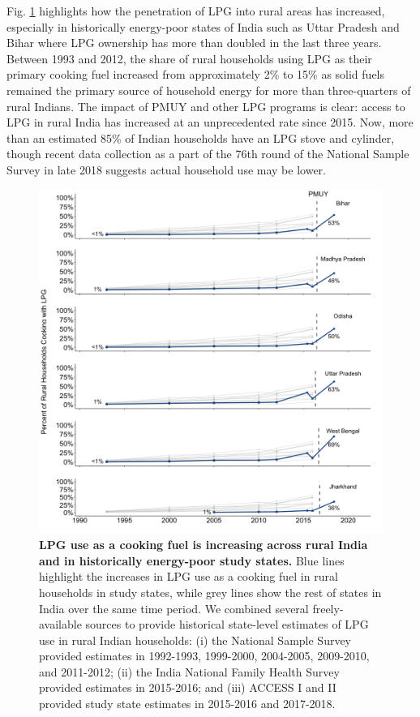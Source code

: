 \documentclass[11pt,english]{article}
\theoremstyle{plain} \newtheorem{claim}{Claim}
\theoremstyle{plain} \newtheorem{prop}{Proposition}
\theoremstyle{plain} \newtheorem{hypo}{Hypothesis}
\begin{document}
Fig. \ref{lpgtransition} highlights how the penetration of LPG into rural areas has increased, especially in historically energy-poor states of India such as Uttar Pradesh and Bihar where LPG ownership has more than doubled in the last three years. Between 1993 and 2012, the share of rural households using LPG as their primary cooking fuel increased from approximately 2\% to 15\% as solid fuels remained the primary source of household energy for more than three-quarters of rural Indians\citep{NationalSampleSurvey2015}. The impact of PMUY and other LPG programs is clear: access to LPG in rural India has increased at an unprecedented rate since 2015. Now, more than an estimated 85\% of Indian households have an LPG stove and cylinder\citep{MOPNG2019}, though recent data collection as a part of the 76th round of the National Sample Survey in late 2018 suggests actual household use may be lower\citep{MOSPI2019}.

 
\begin{figure}[h!]
\centering
\includegraphics[scale=0.46]{Figures/StateLPGTransition_Facet_Rural.png}
\caption{\textbf{LPG use as a cooking fuel is increasing across rural India and in historically energy-poor study states.} Blue lines highlight the increases in LPG use as a cooking fuel in rural households in study states, while grey lines show the rest of states in India over the same time period. We combined several freely-available sources to provide historical state-level estimates of LPG use in rural Indian households: (i) the National Sample Survey provided estimates in 1992-1993, 1999-2000, 2004-2005, 2009-2010, and 2011-2012; (ii) the India National Family Health Survey provided estimates in 2015-2016; and (iii) ACCESS I and II provided study state estimates in 2015-2016 and 2017-2018.}
\label{lpgtransition}
\end{figure}
\end{document}
